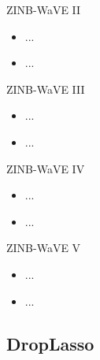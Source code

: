 \documentclass{beamer}
\begin{document}
\begin{frame}{ZINB-WaVE II}

\begin{itemize}
  \itemsep10pt
  \item ...
  \item ...
\end{itemize}

\end{frame}


\begin{frame}{ZINB-WaVE III}

\begin{itemize}
  \itemsep10pt
  \item ...
  \item ...
\end{itemize}

\end{frame}


\begin{frame}{ZINB-WaVE IV}

\begin{itemize}
  \itemsep10pt
  \item ...
  \item ...
\end{itemize}

\end{frame}


\begin{frame}{ZINB-WaVE V}

\begin{itemize}
  \itemsep10pt
  \item ...
  \item ...
\end{itemize}

\end{frame}

\subsection{DropLasso}
\end{document}
